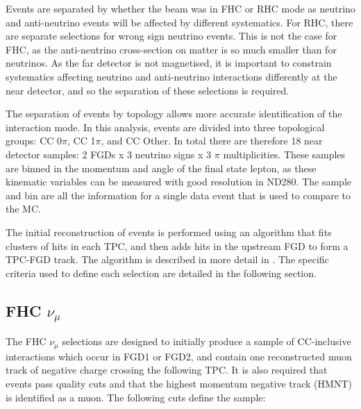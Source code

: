 Events are separated by whether the beam was in FHC or RHC mode as neutrino and anti-neutrino events will be affected by different systematics. For RHC, there are separate selections for wrong sign neutrino events. This is not the case for FHC, as the anti-neutrino cross-section on matter is so much smaller than for neutrinos. As the far detector is not magnetised, it is important to constrain systematics affecting neutrino and anti-neutrino interactions differently at the near detector, and so the separation of these selections is required. 

The separation of events by topology allows more accurate identification of the interaction mode. In this analysis, events are divided into three topological groups: CC 0$\pi$, CC 1$\pi$, and CC Other. In total there are therefore 18 near detector samples: 2 FGDs x 3 neutrino signs x 3 $\pi$ multiplicities. These samples are binned in the momentum and angle of the final state lepton, as these kinematic variables can be measured with good resolution in ND280. The sample and bin are all the information for a single data event that is used to compare to the MC. 

The initial reconstruction of events is performed using an algorithm that fits clusters of hits in each TPC, and then adds hits in the upstream FGD to form a TPC-FGD track. The algorithm is described in more detail in \cite{tn212}. The specific criteria used to define each selection are detailed in the following section. 

\subsection{FHC $\nu_{\mu}$}

The FHC $\nu_{\mu}$ selections are designed to initially produce a sample of CC-inclusive interactions which occur in FGD1 or FGD2, and contain one reconstructed muon track of negative charge crossing the following TPC. It is also required that events pass quality cuts and that the highest momentum negative track (HMNT) is identified as a muon. The following cuts define the sample:

